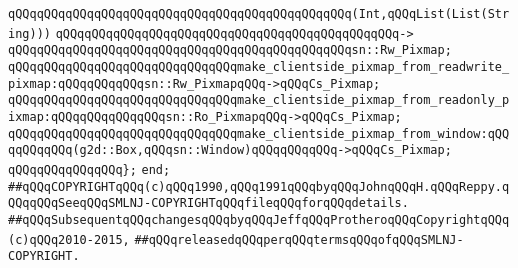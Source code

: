 \verb|qQQqqQQqqQQqqQQqqQQqqQQqqQQqqQQqqQQqqQQqqQQqqQQq(Int,qQQqList(List(String)))|\newline
\verb|qQQqqQQqqQQqqQQqqQQqqQQqqQQqqQQqqQQqqQQqqQQqqQQq->|\newline
\verb|qQQqqQQqqQQqqQQqqQQqqQQqqQQqqQQqqQQqqQQqqQQqqQQqsn::Rw_Pixmap;|\newline
\newline
\verb|qQQqqQQqqQQqqQQqqQQqqQQqqQQqqQQqmake_clientside_pixmap_from_readwrite_pixmap:qQQqqQQqqQQqsn::Rw_PixmapqQQq->qQQqCs_Pixmap;|\newline
\verb|qQQqqQQqqQQqqQQqqQQqqQQqqQQqqQQqmake_clientside_pixmap_from_readonly_pixmap:qQQqqQQqqQQqqQQqsn::Ro_PixmapqQQq->qQQqCs_Pixmap;|\newline
\verb|qQQqqQQqqQQqqQQqqQQqqQQqqQQqqQQqmake_clientside_pixmap_from_window:qQQqqQQqqQQq(g2d::Box,qQQqsn::Window)qQQqqQQqqQQq->qQQqCs_Pixmap;|\newline
\verb|qQQqqQQqqQQqqQQq};|\newline
\newline
\verb|end;|\newline
\newline
\verb|##qQQqCOPYRIGHTqQQq(c)qQQq1990,qQQq1991qQQqbyqQQqJohnqQQqH.qQQqReppy.qQQqqQQqSeeqQQqSMLNJ-COPYRIGHTqQQqfileqQQqforqQQqdetails.|\newline
\verb|##qQQqSubsequentqQQqchangesqQQqbyqQQqJeffqQQqProtheroqQQqCopyrightqQQq(c)qQQq2010-2015,|\newline
\verb|##qQQqreleasedqQQqperqQQqtermsqQQqofqQQqSMLNJ-COPYRIGHT.|\newline

